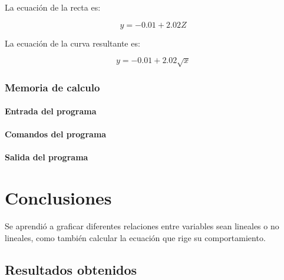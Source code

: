 \documentclass[letter,11pt]{article}
\begin{document}
La ecuación de la recta es:

\begin{equation}
    y = -0.01 + 2.02 Z
\end{equation}

La ecuación de la curva resultante es:

\begin{equation}
    y = -0.01 + 2.02 \sqrt{x}
\end{equation}

\subsubsection{Memoria de calculo}

\paragraph{Entrada del programa}
\begin{alltt}
\footnotesize

\normalsize
\end{alltt}

\paragraph{Comandos del programa}
\begin{alltt}
\footnotesize

\normalsize
\end{alltt}

\paragraph{Salida del programa}
\begin{alltt}
\footnotesize

\normalsize
\end{alltt}

\section{Conclusiones}
Se aprendió a graficar diferentes relaciones entre variables sean lineales o
no lineales, como también calcular la ecuación que rige su comportamiento.

\subsection{Resultados obtenidos}
\end{document}
